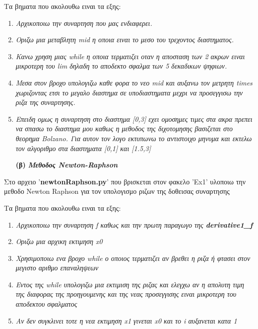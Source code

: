 \documentclass[a4paper,11pt]{article}
\begin{document}
	\begin{center}
		Τα βηματα που ακολουθω ειναι τα εξης:
	\end{center}
	
	\begin{enumerate}
		\item {\emph{Aρχικοποιω την συναρτηση που μας ενδιαφερει. }}
		\item {\emph{Oριζω μια μεταβλητη mid η οποια ειναι το μεσο του τρεχοντος διαστηματος.}}
		\item {\emph{Κανω χρηση μιας while η οποια τερματιζει οταν η αποσταση των 2 ακρων ειναι μικροτερη του lim δηλαδη το αποδεκτο σφαλμα των 5 δεκαδικων ψηφιων.}}
		\item {\emph{Μεσα στον βροχο υπολογιζω καθε φορα το νεο mid και αυξανω τον μετρητη times χωριζοντας ετσι το μεγαλο διαστημα σε υποδιαστηματα μεχρι να προσεγγισω την ριζα της συναρτησης.}}
		\item {\emph{Επειδη ομως η συναρτηση στο διαστημα [0,3] εχει ομοσημες τιμες στα ακρα πρεπει να σπασω το διαστημα μου καθως η μεθοδος της διχοτομησης βασιζεται στο θεορημα Βolzano. Για αυτον τον λογο εκτυπωνω το αντιστοιχο μηνυμα και εκτελω τον αλγοριθμο στα διαστηματα [0,1] και [1.5,3]
		}}
	\end{enumerate}
	
\vspace{0.2cm}
	\begin{enumerate}
		\item[\textbf{(β)}] \emph {\textbf{Μεθοδος Newton-Raphson}}
	\end{enumerate}
	\begin{center}
		Στο αρχειο '\textbf{newtonRaphson.py}' που βρισκεται στον φακελο 'Ex1' υλοποιω την μεθοδο Newton Raphson για τον υπολογισμο ριζων της δοθεισας συναρτησης 
	\end{center}
		\begin{center}
		Τα βηματα που ακολουθω ειναι τα εξης:
	\end{center}
	
	\begin{enumerate}
		\item {\emph{Aρχικοποιω την συναρτηση f καθως και την πρωτη παραγωγο της \textbf{derivative1\_f}}}
		\item {\emph{Οριζω μια αρχικη εκτιμηση x0 }}
		\item {\emph{Χρησιμοποιω ενα βροχο while ο οποιος τερματιζει αν βρεθει η ριζα ή φτασει στον μεγιστο αριθμο επαναληψεων}}
		\item {\emph{Εντος της while υπολογιζω μια εκτιμιση της ριζας και ελεγχω αν η απολυτη τιμη της διαφορας της προηγουμενης και της νεας προσεγγισης ειναι μικροτερη του αποδεκτου σφαλματος}}
		\item {\emph{Αν δεν συγκλινει τοτε η νεα εκτιμηση x1 γινεται x0 και το i αυξανεται κατα 1}}		
	\end{enumerate}
	
\end{document}
